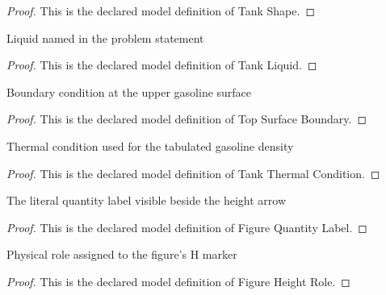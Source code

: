 \begin{proof}
  This is the declared model definition of Tank Shape.
\end{proof}
\begin{definition}
  \label{def:physics:phyx-mini-0382:phyxminiproblems-problemphyxmini0382-tankliquid}
  Liquid named in the problem statement
\end{definition}
\begin{proof}
  This is the declared model definition of Tank Liquid.
\end{proof}
\begin{definition}
  \label{def:physics:phyx-mini-0382:phyxminiproblems-problemphyxmini0382-topsurfaceboundary}
  Boundary condition at the upper gasoline surface
\end{definition}
\begin{proof}
  This is the declared model definition of Top Surface Boundary.
\end{proof}
\begin{definition}
  \label{def:physics:phyx-mini-0382:phyxminiproblems-problemphyxmini0382-tankthermalcondition}
  Thermal condition used for the tabulated gasoline density
\end{definition}
\begin{proof}
  This is the declared model definition of Tank Thermal Condition.
\end{proof}
\begin{definition}
  \label{def:physics:phyx-mini-0382:phyxminiproblems-problemphyxmini0382-figurequantitylabel}
  The literal quantity label visible beside the height arrow
\end{definition}
\begin{proof}
  This is the declared model definition of Figure Quantity Label.
\end{proof}
\begin{definition}
  \label{def:physics:phyx-mini-0382:phyxminiproblems-problemphyxmini0382-figureheightrole}
  Physical role assigned to the figure's H marker
\end{definition}
\begin{proof}
  This is the declared model definition of Figure Height Role.
\end{proof}

